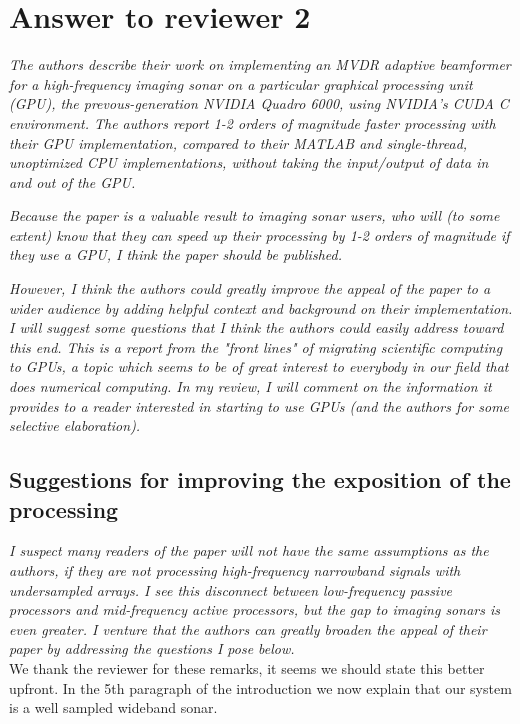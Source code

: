 \documentclass[11pt]{article} %
\newcommand\1{\vec 1}
\newcommand\q[1]{\textit{#1}}
\newcommand\ans[1]{#1}
\begin{document}
\newpage
\section{Answer to reviewer 2}

\q{The authors describe their work on implementing an MVDR adaptive beamformer for a high-frequency imaging sonar on a particular graphical processing unit (GPU), the prevous-generation NVIDIA Quadro 6000, using NVIDIA's CUDA C environment. The authors report 1-2 orders of magnitude faster processing with their GPU implementation, compared to their MATLAB and single-thread, unoptimized CPU implementations, without taking the input/output of data in and out of the GPU.}

\q{Because the paper is a valuable result to imaging sonar users, who will (to some extent) know that they can speed up their processing by 1-2 orders of magnitude if they use a GPU, I think the paper should be published.}

\q{However, I think the authors could greatly improve the appeal of the paper to a wider audience by adding helpful context and background on their implementation. I will suggest some questions that I think the authors could easily address toward this end. This is a report from the "front lines" of migrating scientific computing to GPUs, a topic which seems to be of great interest to everybody in our field that does numerical computing. In my review, I will comment on the information it provides to a reader interested in starting to use GPUs (and the authors for some selective elaboration).}

\subsection*{Suggestions for improving the exposition of the processing}

\q{I suspect many readers of the paper will not have the same assumptions as the authors, if they are not processing high-frequency narrowband signals with undersampled arrays. I see this disconnect between low-frequency passive processors and mid-frequency active processors, but the gap to imaging sonars is even greater. I venture that the authors can greatly broaden the appeal of their paper by addressing the questions I pose below.}\\[-.5\baselineskip]

\ans{We thank the reviewer for these remarks, it seems we should state this better upfront. In the 5th paragraph of the introduction we now explain that our system is a well sampled wideband sonar.}
\end{document}
